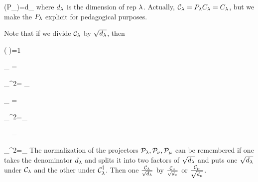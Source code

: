 \beq
\tr(P_\lam)=d_\lam
\eeq
where $d_\lambda$ is the dimension of rep $\lambda$.
Actually, ${\cal C}_\lambda=P_\lambda C_\lambda=C_\lambda$,
but we make the $P_\lambda$ explicit
for pedagogical purposes.

Note that if we divide
${\cal C}_\lambda$ by $\sqrt{d_\lambda}$,
then

\beq
\tr\left(\frac{\calc_\lam}
{} 
\frac{\calc^\dagger_\lam}
{} 
\right)=1
\eeq



\beq
{\color{red}\calp_\lam}
=
\bcen
{}
\ecen
\eeq

\beq
\calp_\lam^2=
\calp_\lam
\eeq


\beq
{\color{blue}\calp_\nu}
=
\bcen
{}
\ecen
\eeq

\beq
\calp_\nu^2=\calp_\nu
\eeq



\beq
{\color{green}\calp_\mu}
=
\bcen
{}
\ecen
\eeq

\beq
\calp_\mu^2=\calp_\mu
\eeq
The normalization of the projectors ${\cal P}_\lambda, {\cal P}_\nu, {\cal P}_\mu$ can be remembered if 
one takes the denominator $d_\lambda$ and splits it into two factors of $\sqrt{d_\lambda}$
and puts one $\sqrt{d_\lambda}$
under ${\cal C}_\lambda$
and the other under ${\cal C}^\dagger_\lambda$. Then
one  $\frac{{\cal C}_\lambda}{\sqrt{d_\lambda}}$
by
$\frac{{\cal C}_\nu}{\sqrt{d_\nu}}$
or
$\frac{{\cal C}_\mu}{\sqrt{d_\mu}}$.



